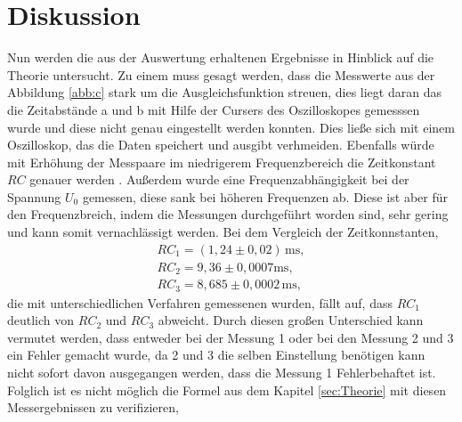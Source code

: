 \section{Diskussion}
\label{sec:Diskussion}
Nun werden die aus der Auswertung erhaltenen
Ergebnisse in Hinblick auf die Theorie untersucht.
Zu einem muss gesagt werden, dass die Messwerte aus der Abbildung \ref{abb:c} stark
um die Ausgleichsfunktion streuen, dies liegt daran das die Zeitabstände a und b mit
Hilfe der Cursers des Oszilloskopes gemesssen wurde und diese nicht genau eingestellt werden konnten.
Dies ließe sich mit einem Oszilloskop, das die Daten speichert und ausgibt verhmeiden.
Ebenfalls würde mit Erhöhung der Messpaare im niedrigerem Frequenzbereich die Zeitkonstant $RC$ genauer werden .
Außerdem wurde eine Frequenzabhängigkeit bei der Spannung $U_0$ gemessen, diese sank bei höheren Frequenzen ab.
Diese ist aber für den Frequenzbreich, indem die Messungen durchgeführt
worden sind, sehr gering und kann somit vernachlässigt werden.
Bei dem Vergleich der Zeitkonnstanten,
\begin{align*}
  RC_\mathrm{1}=(1,24\pm0,02)\,\si{\milli\second},\\
  RC_\mathrm{2}=9,36 \pm 0,0007\si{\milli\second},\\
  RC_\mathrm{3}=8,685\pm0,0002\,\si{\milli\second},
\end{align*}
die mit unterschiedlichen Verfahren gemessenen wurden, fällt auf, dass
 $RC_\mathrm{1}$ deutlich von $RC_\mathrm{2}$ und $RC_\mathrm{3}$ abweicht. Durch diesen großen Unterschied
 kann vermutet werden, dass entweder bei der Messung 1  oder bei den Messung 2 und 3 ein Fehler gemacht wurde, da 2 und 3 die selben Einstellung
 benötigen kann nicht sofort davon ausgegangen werden, dass die Messung 1 Fehlerbehaftet ist.
 Folglich ist es nicht möglich die Formel  aus dem Kapitel \ref{sec:Theorie} mit diesen Messergebnissen zu verifizieren,
